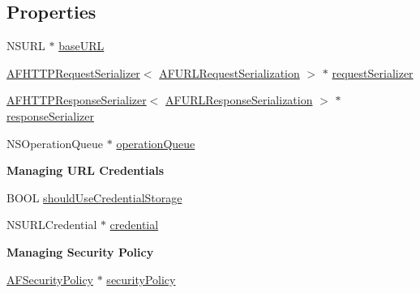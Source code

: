 \subsection*{Properties}
\begin{DoxyCompactItemize}
\item 
N\+S\+U\+R\+L $\ast$ \hyperlink{interface_a_f_h_t_t_p_request_operation_manager_a3281a6f072145aa228701859e3cc5ecd}{base\+U\+R\+L}
\item 
\hyperlink{interface_a_f_h_t_t_p_request_serializer}{A\+F\+H\+T\+T\+P\+Request\+Serializer}$<$ \hyperlink{protocol_a_f_u_r_l_request_serialization-p}{A\+F\+U\+R\+L\+Request\+Serialization} $>$ $\ast$ \hyperlink{interface_a_f_h_t_t_p_request_operation_manager_ad5b4501e37b6b27dd94b17cd16d87287}{request\+Serializer}
\item 
\hyperlink{interface_a_f_h_t_t_p_response_serializer}{A\+F\+H\+T\+T\+P\+Response\+Serializer}$<$ \hyperlink{protocol_a_f_u_r_l_response_serialization-p}{A\+F\+U\+R\+L\+Response\+Serialization} $>$ $\ast$ \hyperlink{interface_a_f_h_t_t_p_request_operation_manager_a17ee8b74e591f5b45414bf502208238f}{response\+Serializer}
\item 
N\+S\+Operation\+Queue $\ast$ \hyperlink{interface_a_f_h_t_t_p_request_operation_manager_a6e21f749221364a42aa042c16c583017}{operation\+Queue}
\end{DoxyCompactItemize}
\begin{Indent}{\bf Managing U\+R\+L Credentials}\par
{\em 

 

 }\begin{DoxyCompactItemize}
\item 
B\+O\+O\+L \hyperlink{interface_a_f_h_t_t_p_request_operation_manager_a9a9619e8520c1842a7aedec71002b81c}{should\+Use\+Credential\+Storage}
\item 
N\+S\+U\+R\+L\+Credential $\ast$ \hyperlink{interface_a_f_h_t_t_p_request_operation_manager_a95eccce77426e7b9022ac52d60749534}{credential}
\end{DoxyCompactItemize}
\end{Indent}
\begin{Indent}{\bf Managing Security Policy}\par
{\em 

 

 }\begin{DoxyCompactItemize}
\item 
\hyperlink{interface_a_f_security_policy}{A\+F\+Security\+Policy} $\ast$ \hyperlink{interface_a_f_h_t_t_p_request_operation_manager_a96785228e50486dbc2d3f236cb87f945}{security\+Policy}
\end{DoxyCompactItemize}
\end{Indent}
